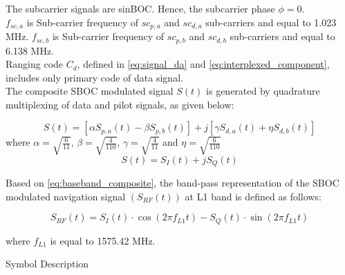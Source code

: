 \noindent The subcarrier signals are sinBOC. Hence, the subcarrier phase $\phi=0$. \\

\noindent $f_{sc,a}$ is Sub-carrier frequency of $sc_{p,a}$ and $sc_{d,a}$ sub-carriers and equal to 1.023 MHz. 
$f_{sc,b}$ is Sub-carrier frequency of $sc_{p,b}$ and $sc_{d,b}$ sub-carriers and equal to 6.138 MHz. \\

\noindent Ranging code $C_d$, defined in \eqref{eq:signal_da} and \eqref{eq:interplexed_component}, includes only primary code of data signal. \\

\noindent The composite SBOC modulated signal $S(t)$  is generated by quadrature multiplexing of data and pilot signals, as given below:

\begin{equation}
S(t) = [\alpha S_{p,a}(t) - \beta S_{p,b}(t)] + j[\gamma S_{d,a}(t) + \eta S_{d,b}(t)]
\label{eq:composite_signal}
\end{equation}
\noindent where $\alpha = \sqrt{\frac{6}{11}}$, $\beta = \sqrt{\frac{4}{110}}$, $\gamma = \sqrt{\frac{4}{11}}$ and $\eta = \sqrt{\frac{6}{110}}$ \\


\begin{equation}
S(t) = S_I(t) + jS_Q(t)
\label{eq:baseband_composite}
\end{equation}

\noindent Based on \eqref{eq:baseband_composite}, the band-pass representation of the SBOC modulated navigation signal $(S_{RF}(t))$ at L1 band is defined as follows:

\begin{equation}
S_{RF}(t) = S_I(t) \cdot \cos(2\pi f_{L1} t) - S_Q(t) \cdot \sin(2\pi f_{L1} t)
\label{eq:bandpass_representation}
\end{equation}

\noindent where \(f_{L1}\) is equal to 1575.42 MHz.

\begin{table}[h]

\vspace{3mm}
\caption{Symbol Description}
\label{table:symbdesc}
\end{table}

\let\cleardoublepage\clearpage
